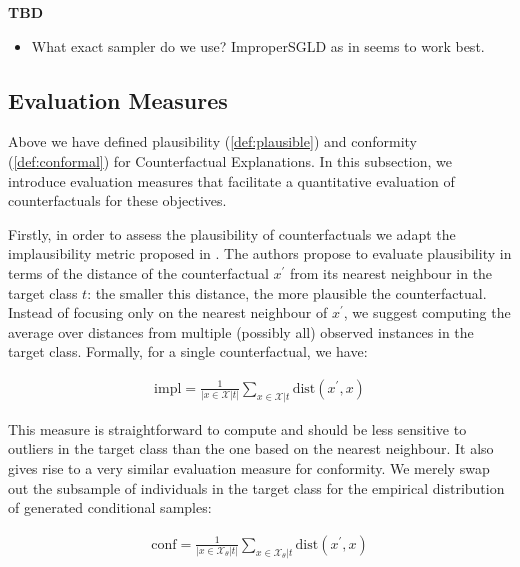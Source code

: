 \documentclass{article}
\begin{document}
\textbf{TBD}

\begin{itemize}
  \item What exact sampler do we use? ImproperSGLD as in \citet{grathwohl2020your} seems to work best.
\end{itemize}

\subsection{Evaluation Measures}\label{evaluation}

Above we have defined plausibility (\ref{def:plausible}) and conformity (\ref{def:conformal}) for Counterfactual Explanations. In this subsection, we introduce evaluation measures that facilitate a quantitative evaluation of counterfactuals for these objectives. 

Firstly, in order to assess the plausibility of counterfactuals we adapt the implausibility metric proposed in \citet{guidotti2022counterfactual}. The authors propose to evaluate plausibility in terms of the distance of the counterfactual $x^{\prime}$ from its nearest neighbour in the target class $t$: the smaller this distance, the more plausible the counterfactual. Instead of focusing only on the nearest neighbour of $x^{\prime}$, we suggest computing the average over distances from multiple (possibly all) observed instances in the target class. Formally, for a single counterfactual, we have:

\begin{equation}\label{eq:impl}
  \begin{aligned}
    \text{impl} = \frac{1}{|x \in \mathcal{X}|t|} \sum_{x \in \mathcal{X}|t} \text{dist}(x^{\prime},x)
  \end{aligned}
\end{equation}

This measure is straightforward to compute and should be less sensitive to outliers in the target class than the one based on the nearest neighbour. It also gives rise to a very similar evaluation measure for conformity. We merely swap out the subsample of individuals in the target class for the empirical distribution of generated conditional samples:

\begin{equation}\label{eq:conf}
  \begin{aligned}
    \text{conf} = \frac{1}{|x \in \mathcal{X}_{\theta}|t|} \sum_{x \in \mathcal{X}_{\theta}|t} \text{dist}(x^{\prime},x)
  \end{aligned}
\end{equation}
\end{document}
